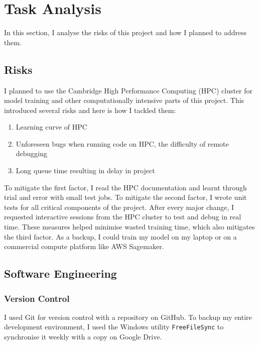 \documentclass[12pt,a4paper,twoside,openany]{report}
\begin{document}
\section{Task Analysis}
In this section, I analyse the risks of this project and how I planned to address them.

\subsection{Risks}
I planned to use the Cambridge High Performance Computing (HPC) cluster for model training and other computationally intensive parts of this project. This introduced several risks and here is how I tackled them:
\begin{enumerate}
    \item Learning curve of HPC
    \item Unforeseen bugs when running code on HPC, the difficulty of remote debugging
    \item Long queue time resulting in delay in project
\end{enumerate}
To mitigate the first factor, I read the HPC documentation and learnt through trial and error with small test jobs. To mitigate the second factor, I wrote unit tests for all critical components of the project. After every major change, I requested interactive sessions from the HPC cluster to test and debug in real time. These measures helped minimise wasted training time, which also mitigates the third factor. As a backup, I could train my model on my laptop or on a commercial compute platform like AWS Sagemaker.

\subsection{Software Engineering}

\subsubsection{Version Control}
I used Git for version control with a repository on GitHub. 
To backup my entire development environment, I used the Windows utility \verb|FreeFileSync| to synchronise it weekly with a copy on Google Drive.
\end{document}
